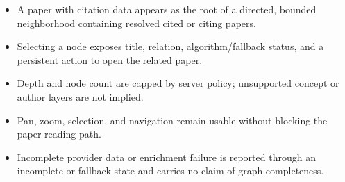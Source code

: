 \begin{itemize}
  \item A paper with citation data appears as the root of a directed, bounded neighborhood containing resolved cited or citing papers.
  \item Selecting a node exposes title, relation, algorithm/fallback status, and a persistent action to open the related paper.
  \item Depth and node count are capped by server policy; unsupported concept or author layers are not implied.
  \item Pan, zoom, selection, and navigation remain usable without blocking the paper-reading path.
  \item Incomplete provider data or enrichment failure is reported through an incomplete or fallback state and carries no claim of graph completeness.
\end{itemize}

